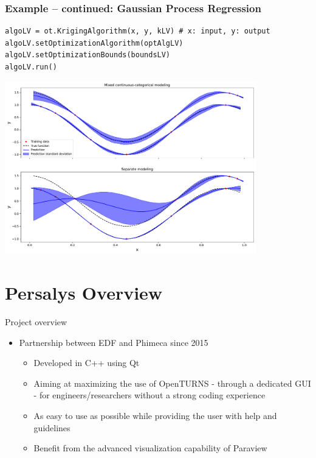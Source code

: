 \documentclass{beamer}
\begin{document}
\begin{frame}[containsverbatim]
  \frametitle{Example -- continued: Gaussian Process Regression}
\small


\begin{lstlisting}
algoLV = ot.KrigingAlgorithm(x, y, kLV) # x: input, y: output
algoLV.setOptimizationAlgorithm(optAlgLV)
algoLV.setOptimizationBounds(boundsLV)
algoLV.run()
\end{lstlisting}
\vspace{-0.19cm}
\centering
\includegraphics[width=0.82\textwidth]{figures/latent_variable_model.pdf}

\end{frame}

\section{Persalys Overview}
\begin{frame}{Project overview}
  \begin{itemize}
  \item
    Partnership between EDF and Phimeca since 2015
  
    \begin{itemize}
    \item
      Developed in C++ using Qt
    \item
      Aiming at maximizing the use of OpenTURNS - through a dedicated GUI
      - for engineers/researchers without a strong coding experience
    \item
      As easy to use as possible while providing the user with help and
      guidelines
    \item
      Benefit from the advanced visualization capability of
      Paraview
    \end{itemize}
  \end{itemize}
  \end{frame}
  
\end{document}
